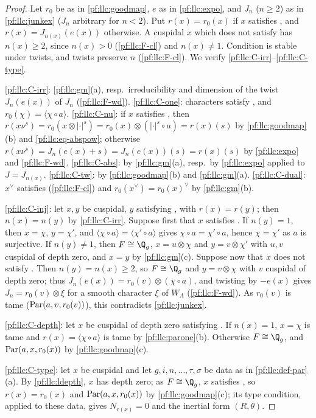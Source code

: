 \begin{proof}
Let $r_0$ be as in \cref{pf:llc:goodmap}, $e$ as in \cref{pf:llc:expo}, and $J_n$ ($n\ge2$) as in \cref{pf:llc:junkex}
($J_n$ arbitrary for $n<2$). Put $r(x)=r_0(x)$ if $x$ satisfies \llcGo{}, and $r(x)=J_{n(x)}(e(x))$ otherwise. A cuspidal $x$
which does not satisfy \llcGo{} has $n(x)\ge2$, since $n(x)>0$ (\ref{pf:llc:F-cl}) and $n(x)\ne1$. Condition \llcGo{} is
stable under twists, and twists preserve $n$ (\ref{pf:llc:F-cl}). We verify \ref{pf:llc:C-irr}--\ref{pf:llc:C-type}.

\ref{pf:llc:C-irr}: \cref{pf:llc:gm}(a), resp.\ irreducibility and dimension of the twist $J_n(e(x))$ of $J_n$
(\ref{pf:llc:F-wd}). \ref{pf:llc:C-one}: characters satisfy \llcGo{}, and $r_0(\chi)=\langle\chi\circ a\rangle$.
\ref{pf:llc:C-nu}: if $x$ satisfies \llcGo{}, then $r(x\nu^s)=r_0(x\otimes|\cdot|^s)=r_0(x)\otimes(|\cdot|^s\circ a)=r(x)(s)$ by
\cref{pf:llc:goodmap}(b) and \eqref{pf:llc:eq-abspow}; otherwise $r(x\nu^s)=J_n(e(x)+s)=J_n(e(x))(s)=r(x)(s)$ by
\cref{pf:llc:expo} and \ref{pf:llc:F-wd}.
\ref{pf:llc:C-abs}: by \cref{pf:llc:gm}(a), resp.\ by \cref{pf:llc:expo} applied to $J=J_{n(x)}$. \ref{pf:llc:C-tw}: by
\cref{pf:llc:goodmap}(b) and \cref{pf:llc:gm}(a). \ref{pf:llc:C-dual}: $x^\vee$ satisfies \llcGo{} (\ref{pf:llc:F-cl}) and
$r_0(x^\vee)=r_0(x)^\vee$ by \cref{pf:llc:gm}(b).

\ref{pf:llc:C-inj}: let $x,y$ be cuspidal, $y$ satisfying \llcGo{}, with $r(x)=r(y)$; then $n(x)=n(y)$ by \ref{pf:llc:C-irr}.
Suppose first that $x$ satisfies \llcGo{}. If $n(y)=1$, then $x=\chi$, $y=\chi'$, and $\langle\chi\circ a\rangle=
\langle\chi'\circ a\rangle$ gives $\chi\circ a=\chi'\circ a$, hence $\chi=\chi'$ as $a$ is surjective. If $n(y)\ne1$, then
$F\cong\Q_g$, $x=u\otimes\chi$ and $y=v\otimes\chi'$ with $u,v$ cuspidal of depth zero, and $x=y$ by \cref{pf:llc:gm}(c).
Suppose now that $x$ does not satisfy \llcGo{}. Then $n(y)=n(x)\ge2$, so $F\cong\Q_g$ and $y=v\otimes\chi$ with $v$ cuspidal of
depth zero; thus $J_n(e(x))=r_0(v)\otimes(\chi\circ a)$, and twisting by $-e(x)$ gives $J_n=r_0(v)\otimes\xi$ for a smooth
character $\xi$ of $W_A$ (\ref{pf:llc:F-wd}). As $r_0(v)$ is tame ($\operatorname{Par}(a,v,r_0(v))$), this contradicts
\cref{pf:llc:junkex}.

\ref{pf:llc:C-depth}: let $x$ be cuspidal of depth zero satisfying \llcGo{}. If $n(x)=1$, $x=\chi$ is tame and
$r(x)=\langle\chi\circ a\rangle$ is tame by \cref{pf:llc:parone}(b). Otherwise $F\cong\Q_g$, and $\operatorname{Par}(a,x,r_0(x))$ by
\cref{pf:llc:goodmap}(c).

\ref{pf:llc:C-type}: let $x$ be cuspidal and let $g,i,n,\dots,\tau,\sigma$ be data as in \cref{pf:llc:def-par}(a). By
\cref{pf:llc:ldepth}, $x$ has depth zero; as $F\cong\Q_g$, $x$ satisfies \llcGo{}, so $r(x)=r_0(x)$ and
$\operatorname{Par}(a,x,r_0(x))$ by \cref{pf:llc:goodmap}(c); its type condition, applied to these data, gives $N_{r(x)}=0$ and the
inertial form $(R,\theta)$.
\end{proof}

